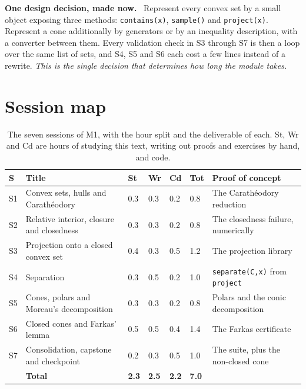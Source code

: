 \documentclass[11pt,a4paper]{article}
\newcommand{\mpart}[1]{\smallskip\noindent\textbf{#1}\ \ignorespaces}
\theoremstyle{definition}
\theoremstyle{plain}
\theoremstyle{remark}
\begin{document}
\mpart{One design decision, made now.} Represent every convex set by a small object exposing
three methods: \texttt{contains(x)}, \texttt{sample()} and \texttt{project(x)}. Represent a
cone additionally by generators or by an inequality description, with a converter between them.
Every validation check in S3 through S7 is then a loop over the same list of sets, and S4, S5
and S6 each cost a few lines instead of a rewrite. \emph{This is the single decision that
determines how long the module takes.}

\clearpage

\section{Session map}

\begin{table}[!ht]
\centering
\small
\caption{The seven sessions of M1, with the hour split and the deliverable of each. St, Wr and
Cd are hours of studying this text, writing out proofs and exercises by hand, and code.}
\label{tab:map}
\begin{tabular}{@{}l L{4.6cm} C{0.7cm}C{0.7cm}C{0.7cm}C{0.7cm} L{4.9cm}@{}}
\toprule
\textbf{S} & \textbf{Title} & \textbf{St} & \textbf{Wr} & \textbf{Cd} & \textbf{Tot}
& \textbf{Proof of concept} \\
\midrule
S1 & Convex sets, hulls and Carath\'eodory              & 0.3 & 0.3 & 0.2 & 0.8
   & The Carath\'eodory reduction \\
S2 & Relative interior, closure and closedness          & 0.3 & 0.3 & 0.2 & 0.8
   & The closedness failure, numerically \\
S3 & Projection onto a closed convex set                & 0.4 & 0.3 & 0.5 & 1.2
   & The projection library \\
S4 & Separation                                         & 0.3 & 0.5 & 0.2 & 1.0
   & \texttt{separate(C,x)} from \texttt{project} \\
S5 & Cones, polars and Moreau's decomposition           & 0.3 & 0.3 & 0.2 & 0.8
   & Polars and the conic decomposition \\
S6 & Closed cones and Farkas' lemma                     & 0.5 & 0.5 & 0.4 & 1.4
   & The Farkas certificate \\
S7 & Consolidation, capstone and checkpoint             & 0.2 & 0.3 & 0.5 & 1.0
   & The suite, plus the non-closed cone \\
\midrule
   & \textbf{Total} & \textbf{2.3} & \textbf{2.5} & \textbf{2.2} & \textbf{7.0} & \\
\bottomrule
\end{tabular}
\end{table}
\end{document}

